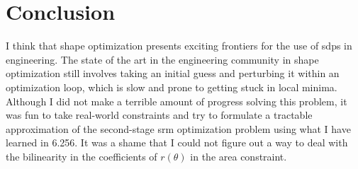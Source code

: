 \section{Conclusion}

I think that shape optimization presents exciting frontiers for the use of \gls{sdp}s in engineering.
The state of the art in the engineering community in shape optimization still involves
taking an initial guess and perturbing it within an optimization loop, which is slow and
prone to getting stuck in local minima. Although I did not make a terrible amount of progress solving this
problem, it was fun to take real-world constraints
and try to formulate a tractable approximation of the second-stage \gls{srm} optimization problem
using what I have learned in 6.256.
It was a shame that I could not figure out a way to deal with the bilinearity in the
coefficients of $r(\theta)$ in the area constraint.
